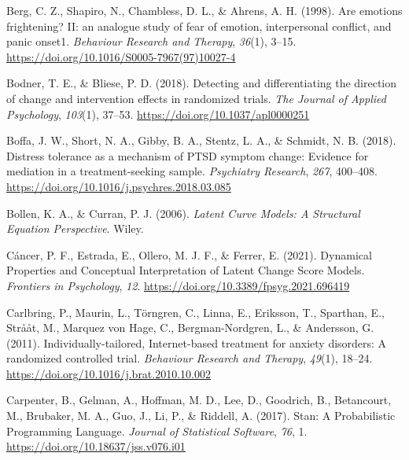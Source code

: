 \documentclass[
  man,floatsintext]{apa7}
\newlength{\cslhangindent}
\newlength{\cslentryspacingunit} %
\newenvironment{CSLReferences}[2] %
 {%
  \setlength{\parindent}{0pt}
  \ifodd #1
  \let\oldpar\par
  \def\par{\hangindent=\cslhangindent\oldpar}
  \fi
  \setlength{\parskip}{#2\cslentryspacingunit}
 }%
 {}
\begin{document}
\begin{CSLReferences}{1}{0}
\leavevmode{}%
Berg, C. Z., Shapiro, N., Chambless, D. L., \& Ahrens, A. H. (1998). Are emotions frightening? II: an analogue study of fear of emotion, interpersonal conflict, and panic onset1. \emph{Behaviour Research and Therapy}, \emph{36}(1), 3--15. \url{https://doi.org/10.1016/S0005-7967(97)10027-4}

\leavevmode{}%
Bodner, T. E., \& Bliese, P. D. (2018). Detecting and differentiating the direction of change and intervention effects in randomized trials. \emph{The Journal of Applied Psychology}, \emph{103}(1), 37--53. \url{https://doi.org/10.1037/apl0000251}

\leavevmode{}%
Boffa, J. W., Short, N. A., Gibby, B. A., Stentz, L. A., \& Schmidt, N. B. (2018). Distress tolerance as a mechanism of PTSD symptom change: Evidence for mediation in a treatment-seeking sample. \emph{Psychiatry Research}, \emph{267}, 400--408. \url{https://doi.org/10.1016/j.psychres.2018.03.085}

\leavevmode{}%
Bollen, K. A., \& Curran, P. J. (2006). \emph{Latent Curve Models: A Structural Equation Perspective}. Wiley.

\leavevmode{}%
Cáncer, P. F., Estrada, E., Ollero, M. J. F., \& Ferrer, E. (2021). Dynamical Properties and Conceptual Interpretation of Latent Change Score Models. \emph{Frontiers in Psychology}, \emph{12}. \url{https://doi.org/10.3389/fpsyg.2021.696419}

\leavevmode{}%
Carlbring, P., Maurin, L., Törngren, C., Linna, E., Eriksson, T., Sparthan, E., Strååt, M., Marquez von Hage, C., Bergman-Nordgren, L., \& Andersson, G. (2011). Individually-tailored, Internet-based treatment for anxiety disorders: A randomized controlled trial. \emph{Behaviour Research and Therapy}, \emph{49}(1), 18--24. \url{https://doi.org/10.1016/j.brat.2010.10.002}

\leavevmode{}%
Carpenter, B., Gelman, A., Hoffman, M. D., Lee, D., Goodrich, B., Betancourt, M., Brubaker, M. A., Guo, J., Li, P., \& Riddell, A. (2017). Stan: A Probabilistic Programming Language. \emph{Journal of Statistical Software}, \emph{76}, 1. \url{https://doi.org/10.18637/jss.v076.i01}


\end{CSLReferences}
\end{document}
